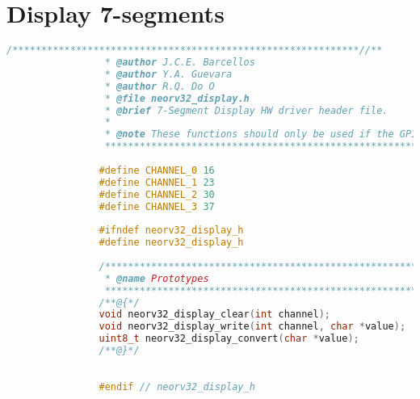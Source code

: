         \section{Display 7-segments}\label{.h:7-segments}
            \begin{lstlisting}[style=mystyle_c, language=c, breaklines]
                /************************************************************//**
                 * @author J.C.E. Barcellos
                 * @author Y.A. Guevara
                 * @author R.Q. Do O
                 * @file neorv32_display.h
                 * @brief 7-Segment Display HW driver header file.
                 *
                 * @note These functions should only be used if the GPIO unit was synthesized (IO_GPIO_EN = true).
                 ***************************************************************/
                 
                #define CHANNEL_0 16
                #define CHANNEL_1 23
                #define CHANNEL_2 30
                #define CHANNEL_3 37
                
                #ifndef neorv32_display_h
                #define neorv32_display_h
                
                /************************************************************//**
                 * @name Prototypes
                 ***************************************************************/
                /**@{*/
                void neorv32_display_clear(int channel);
                void neorv32_display_write(int channel, char *value);
                uint8_t neorv32_display_convert(char *value);
                /**@}*/
                
                
                #endif // neorv32_display_h
        \end{lstlisting}